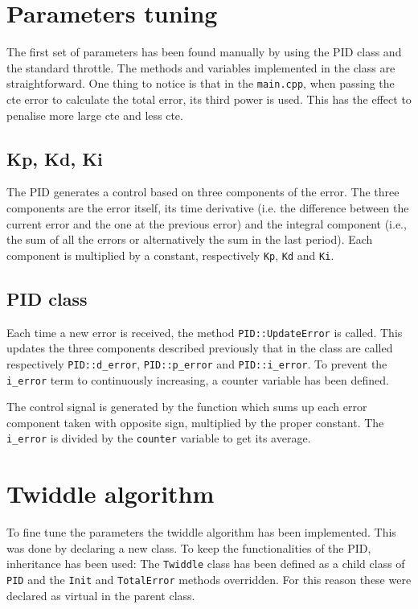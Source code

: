 \documentclass{article}
\let\cd\lstinline
\begin{document}
\section{Parameters tuning}
The first set of parameters has been found manually by using the PID class and the standard throttle. The methods and variables implemented in the class are straightforward. One thing to notice is that in the \cd+main.cpp+, when passing the cte error to calculate the total error, its third power is used. This has the effect to penalise more large cte and less cte.


\subsection{Kp, Kd, Ki}
The PID generates a control based on three components of the error. The three components are the error itself, its time derivative (i.e. the difference between the current error and the one at the previous error) and the integral component (i.e., the sum of all the errors or alternatively the sum in the last period). Each component is multiplied by a constant, respectively \cd+Kp+, \cd+Kd+ and \cd+Ki+. 

\subsection{PID class}
Each time a new error is received, the method \cd+PID::UpdateError+ is called. This updates the three components described previously that in the class are called respectively \cd+PID::d_error+, \cd+PID::p_error+ and \cd+PID::i_error+. To prevent the \cd+i_error+ term to continuously increasing, a counter variable has been defined.

The control signal is generated by the function which sums up each error component taken with opposite sign, multiplied by the proper constant. The \cd+i_error+ is divided by the \cd+counter+ variable to get its average.

\section{Twiddle algorithm}
To fine tune the parameters the twiddle algorithm has been implemented. This was done by declaring a new class. To keep the functionalities of the PID, inheritance has been used: The \cd+Twiddle+ class has been defined as a child class of \cd+PID+ and the \cd+Init+ and \cd+TotalError+ methods overridden. For this reason these were declared as virtual in the parent class.
\end{document}
